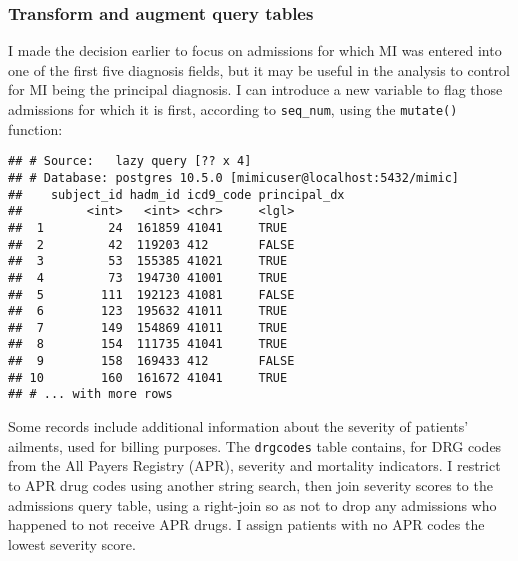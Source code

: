 \documentclass[]{article}
\newenvironment{Shaded}{\begin{snugshade}}{\end{snugshade}}
\newcommand{\KeywordTok}[1]{\textcolor[rgb]{0.13,0.29,0.53}{\textbf{#1}}}
\newcommand{\DataTypeTok}[1]{\textcolor[rgb]{0.13,0.29,0.53}{#1}}
\newcommand{\DecValTok}[1]{\textcolor[rgb]{0.00,0.00,0.81}{#1}}
\newcommand{\StringTok}[1]{\textcolor[rgb]{0.31,0.60,0.02}{#1}}
\newcommand{\OperatorTok}[1]{\textcolor[rgb]{0.81,0.36,0.00}{\textbf{#1}}}
\newcommand{\NormalTok}[1]{#1}
\begin{document}
\subsubsection{Transform and augment query
tables}\label{transform-and-augment-query-tables}

I made the decision earlier to focus on admissions for which MI was
entered into one of the first five diagnosis fields, but it may be
useful in the analysis to control for MI being the principal diagnosis.
I can introduce a new variable to flag those admissions for which it is
first, according to \texttt{seq\_num}, using the \texttt{mutate()}
function:

\begin{Shaded}
\end{Shaded}

\begin{verbatim}
## # Source:   lazy query [?? x 4]
## # Database: postgres 10.5.0 [mimicuser@localhost:5432/mimic]
##    subject_id hadm_id icd9_code principal_dx
##         <int>   <int> <chr>     <lgl>       
##  1         24  161859 41041     TRUE        
##  2         42  119203 412       FALSE       
##  3         53  155385 41021     TRUE        
##  4         73  194730 41001     TRUE        
##  5        111  192123 41081     FALSE       
##  6        123  195632 41011     TRUE        
##  7        149  154869 41011     TRUE        
##  8        154  111735 41041     TRUE        
##  9        158  169433 412       FALSE       
## 10        160  161672 41041     TRUE        
## # ... with more rows
\end{verbatim}

Some records include additional information about the severity of
patients' ailments, used for billing purposes. The \texttt{drgcodes}
table contains, for DRG codes from the All Payers Registry (APR),
severity and mortality indicators. I restrict to APR drug codes using
another string search, then join severity scores to the admissions query
table, using a right-join so as not to drop any admissions who happened
to not receive APR drugs. I assign patients with no APR codes the lowest
severity score.
\end{document}
